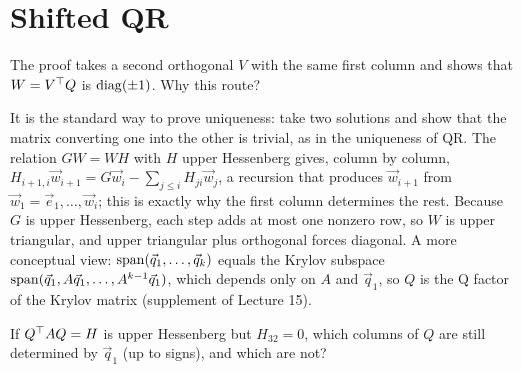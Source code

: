\chapter{Shifted QR}

\begin{question}[Why is the implicit Q theorem proved through $W = V^\T Q$?]
  \label{q:implicit-q-strategy}
  The proof takes a second orthogonal $V$ with the same first column and shows that $W = V^\T Q$ is $\operatorname{diag}(\pm 1)$. Why this route?
\end{question}

\begin{answer}
  It is the standard way to prove uniqueness: take two solutions and show that the matrix converting one into the other is trivial, as in the uniqueness of QR. The relation $GW = WH$ with $H$ upper Hessenberg gives, column by column, $H_{i+1,i}\vec{w}_{i+1} = G\vec{w}_i - \sum_{j \le i}H_{ji}\vec{w}_j$, a recursion that produces $\vec{w}_{i+1}$ from $\vec{w}_1 = \vec{e}_1, \dots, \vec{w}_i$; this is exactly why the first column determines the rest. Because $G$ is upper Hessenberg, each step adds at most one nonzero row, so $W$ is upper triangular, and upper triangular plus orthogonal forces diagonal. A more conceptual view: $\operatorname{span}(\vec{q}_1, \dots, \vec{q}_k)$ equals the Krylov subspace $\operatorname{span}(\vec{q}_1, A\vec{q}_1, \dots, A^{k-1}\vec{q}_1)$, which depends only on $A$ and $\vec{q}_1$, so $Q$ is the Q factor of the Krylov matrix (supplement of Lecture 15).
\end{answer}

\begin{question}
  \label{q:implicit-q-reduced}
  If $Q^\top AQ = H$ is upper Hessenberg but $H_{32} = 0$, which columns of $Q$ are still determined by $\vec{q}_1$ (up to signs), and which are not?
\end{question}

\begin{answer}
  \unanswered
\end{answer}
